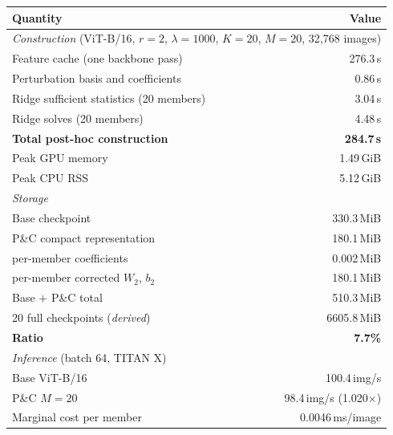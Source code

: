 \begin{tabular}{lr}
\toprule
Quantity & Value \\
\midrule
\multicolumn{2}{l}{\emph{Construction} (ViT-B/16, $r{=}2$, $\lambda{=}1000$, $K{=}20$, $M{=}20$, 32{,}768 images)} \\
Feature cache (one backbone pass) & 276.3\,s \\
Perturbation basis and coefficients & 0.86\,s \\
Ridge sufficient statistics (20 members) & 3.04\,s \\
Ridge solves (20 members) & 4.48\,s \\
\textbf{Total post-hoc construction} & \textbf{284.7\,s} \\
Peak GPU memory & 1.49\,GiB \\
Peak CPU RSS & 5.12\,GiB \\
\midrule
\multicolumn{2}{l}{\emph{Storage}} \\
Base checkpoint & 330.3\,MiB \\
P\&C compact representation & 180.1\,MiB \\
\quad per-member coefficients & 0.002\,MiB \\
\quad per-member corrected $W_2$, $b_2$ & 180.1\,MiB \\
Base $+$ P\&C total & 510.3\,MiB \\
20 full checkpoints (\emph{derived}) & 6605.8\,MiB \\
\textbf{Ratio} & \textbf{7.7\%} \\
\midrule
\multicolumn{2}{l}{\emph{Inference} (batch 64, TITAN X)} \\
Base ViT-B/16 & 100.4\,img/s \\
P\&C $M{=}20$ & 98.4\,img/s (1.020$\times$) \\
Marginal cost per member & 0.0046\,ms/image \\
\bottomrule
\end{tabular}
